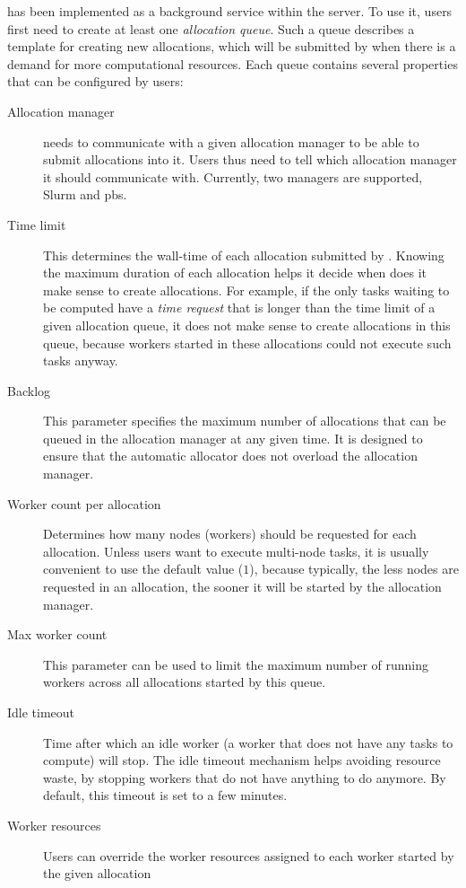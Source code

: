 \Autoalloc{} has been implemented as a background service within the
\hyperqueue{} server. To use it, users first need to create at least one
\emph{allocation queue}. Such a queue describes a template for creating new allocations, which will
be submitted by \hq{} when there is a demand for more computational resources.
Each queue contains several properties that can be configured by users:

\begin{description}
	\item[Allocation manager] \Autoalloc{} needs to communicate with a given allocation manager
		to be able to submit allocations into it. Users thus need to tell \hq{} which
		allocation manager it should communicate with. Currently, two managers are supported, Slurm and
		\gls{pbs}.
	\item[Time limit] This determines the wall-time of each allocation submitted by \autoalloc{}. Knowing the
		maximum duration of each allocation helps it decide when does it make sense to create allocations.
		For example, if the only tasks waiting to be computed have a \emph{time request} that is longer
		than the time limit of a given allocation queue, it does not make sense to create allocations in
		this queue, because workers started in these allocations could not execute such tasks anyway.
	\item[Backlog] This parameter specifies the maximum number of allocations that can be queued in the allocation
		manager at any given time. It is designed to ensure that the automatic allocator does not overload
		the allocation manager.
	\item[Worker count per allocation] Determines how many nodes (workers) should be requested for each allocation. Unless users want to
		execute multi-node tasks, it is usually convenient to use the default value
		($1$), because typically, the less nodes are requested in an allocation, the
		sooner it will be started by the allocation manager.
	\item[Max worker count] This parameter can be used to limit the maximum number of running workers across all allocations
		started by this queue.
	\item[Idle timeout] Time after which an idle worker (a worker that does not have any tasks to compute) will stop. The
		idle timeout mechanism helps avoiding resource waste, by stopping workers that do not have anything
		to do anymore. By default, this timeout is set to a few minutes.
	\item[Worker resources] Users can override the worker resources assigned to each worker started by the given allocation

\end{description}
